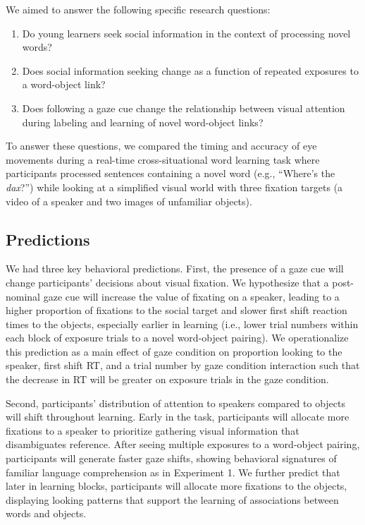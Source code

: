 \documentclass[oneside]{report}
\begin{document}
We aimed to answer the following specific research questions:
\begin{enumerate}
\def\labelenumi{\arabic{enumi}.}
\tightlist
\item
  Do young learners seek social information in the context of processing
  novel words?\\
\item
  Does social information seeking change as a function of repeated
  exposures to a word-object link?
\item
  Does following a gaze cue change the relationship between visual
  attention during labeling and learning of novel word-object links?
\end{enumerate}
To answer these questions, we compared the timing and accuracy of eye
movements during a real-time cross-situational word learning task where
participants processed sentences containing a novel word (e.g.,
``Where's the \emph{dax}?'') while looking at a simplified visual world
with three fixation targets (a video of a speaker and two images of
unfamiliar objects).

\subsection{Predictions}\label{predictions}

We had three key behavioral predictions. First, the presence of a gaze
cue will change participants' decisions about visual fixation. We
hypothesize that a post-nominal gaze cue will increase the value of
fixating on a speaker, leading to a higher proportion of fixations to
the social target and slower first shift reaction times to the objects,
especially earlier in learning (i.e., lower trial numbers within each
block of exposure trials to a novel word-object pairing). We
operationalize this prediction as a main effect of gaze condition on
proportion looking to the speaker, first shift RT, and a trial number by
gaze condition interaction such that the decrease in RT will be greater
on exposure trials in the gaze condition.

Second, participants' distribution of attention to speakers compared to
objects will shift throughout learning. Early in the task, participants
will allocate more fixations to a speaker to prioritize gathering visual
information that disambiguates reference. After seeing multiple
exposures to a word-object pairing, participants will generate faster
gaze shifts, showing behavioral signatures of familiar language
comprehension as in Experiment 1. We further predict that later in
learning blocks, participants will allocate more fixations to the
objects, displaying looking patterns that support the learning of
associations between words and objects.
\end{document}
